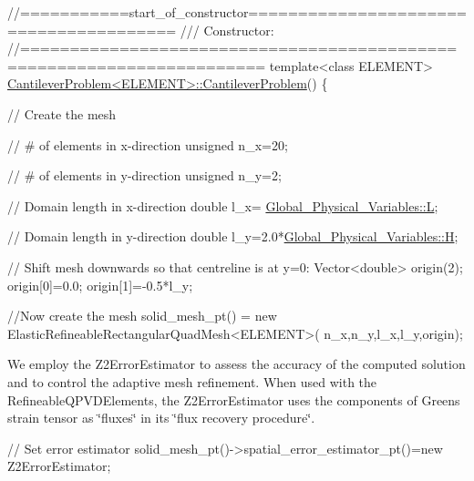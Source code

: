  
\begin{DoxyCodeInclude}
\textcolor{comment}{//===========start\_of\_constructor======================================= }
\textcolor{comment}{/// Constructor: }
\textcolor{comment}{}\textcolor{comment}{//====================================================================== }
\textcolor{keyword}{template}<\textcolor{keyword}{class} ELEMENT>
\hyperlink{classCantileverProblem_abba97fc4b8402bc0363fdf16322f6572}{CantileverProblem<ELEMENT>::CantileverProblem}() 
\{

 \textcolor{comment}{// Create the mesh}

 \textcolor{comment}{// # of elements in x-direction}
 \textcolor{keywordtype}{unsigned} n\_x=20;

 \textcolor{comment}{// # of elements in y-direction}
 \textcolor{keywordtype}{unsigned} n\_y=2;

 \textcolor{comment}{// Domain length in x-direction}
 \textcolor{keywordtype}{double} l\_x= \hyperlink{namespaceGlobal__Physical__Variables_a1b8bfc451f6b7ac89eca18f04338f47f}{Global\_Physical\_Variables::L};

 \textcolor{comment}{// Domain length in y-direction}
 \textcolor{keywordtype}{double} l\_y=2.0*\hyperlink{namespaceGlobal__Physical__Variables_af6e07423e22c0991084d9a2f43727805}{Global\_Physical\_Variables::H};

 \textcolor{comment}{// Shift mesh downwards so that centreline is at y=0:}
 Vector<double> origin(2);
 origin[0]=0.0;
 origin[1]=-0.5*l\_y;

 \textcolor{comment}{//Now create the mesh }
 solid\_mesh\_pt() = \textcolor{keyword}{new} ElasticRefineableRectangularQuadMesh<ELEMENT>(
  n\_x,n\_y,l\_x,l\_y,origin);

\end{DoxyCodeInclude}


We employ the {\ttfamily Z2\+Error\+Estimator} to assess the accuracy of the computed solution and to control the adaptive mesh refinement. When used with the {\ttfamily Refineable\+Q\+P\+V\+D\+Elements}, the {\ttfamily Z2\+Error\+Estimator} uses the components of Green\textquotesingle{}s strain tensor as \char`\"{}fluxes\char`\"{} in its \char`\"{}flux recovery procedure\char`\"{}.


\begin{DoxyCodeInclude}
 \textcolor{comment}{// Set error estimator}
 solid\_mesh\_pt()->spatial\_error\_estimator\_pt()=\textcolor{keyword}{new} Z2ErrorEstimator;

\end{DoxyCodeInclude}


